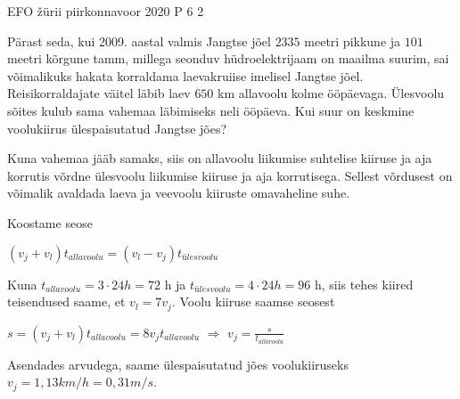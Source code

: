 {EFO žürii} %
{piirkonnavoor} %
{2020} %
{P 6} %
{2} %
{

\ifStatement
Pärast seda, kui 2009. aastal valmis Jangtse jõel $2335$ meetri pikkune ja $101$ meetri kõrgune tamm, millega seonduv hüdroelektrijaam on maailma suurim, sai võimalikuks hakata korraldama laevakruiise imelisel Jangtse jõel. Reisikorraldajate väitel läbib laev $650$ km allavoolu kolme ööpäevaga. Ülesvoolu sõites kulub sama vahemaa läbimiseks neli ööpäeva. Kui suur on keskmine voolukiirus ülespaisutatud Jangtse jões?
\fi

\ifHint
Kuna vahemaa jääb samaks, siis on allavoolu liikumise suhtelise kiiruse ja aja korrutis võrdne ülesvoolu liikumise kiiruse ja aja korrutisega. Sellest võrdusest on võimalik avaldada laeva ja veevoolu kiiruste omavaheline suhe.
\fi

\ifSolution
Koostame seose
\begin{center}
$(v_j + v_l) t_{allavoolu} = (v_l - v_j)t_{ülesvoolu}$
\end{center}
Kuna $t_{allavoolu} = 3 \cdot 24 h = 72$ h ja $t_{ülesvoolu} = 4 \cdot 24 h = 96$ h, siis tehes kiired teisendused saame, et $v_l = 7v_j$.
\newline
Voolu kiiruse saamse seosest
\begin{center}
$s = (v_j + v_l) t_{allavoolu} = 8v_jt_{allavoolu}$ $\Rightarrow$ $v_j = \frac{s}{t_{allavoolu}}$
\end{center}
Asendades arvudega, saame ülespaisutatud jões voolukiiruseks $v_j = 1,13 km/h = 0,31 m/s$.
\fi
}